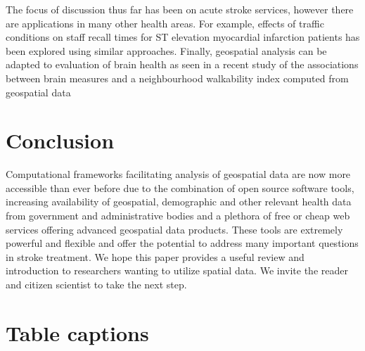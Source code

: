 \documentclass[utf8]{frontiersHLTH}
\begin{document}
The focus of discussion thus far has been on acute stroke services,
however there are applications in many other health areas. For
example, effects of traffic conditions on staff recall times for ST
elevation myocardial infarction patients has been explored using
similar approaches\cite{10.3389/fcvm.2017.00089}. Finally, geospatial
analysis can be adapted to evaluation of brain health as seen in a
recent study of the associations between brain measures and a
neighbourhood walkability index computed from geospatial data
\cite{cerin2017associations}

\section{Conclusion}
Computational frameworks facilitating analysis of geospatial data are
now more accessible than ever before due to the combination of open
source software tools, increasing availability of geospatial,
demographic and other relevant health data from government and
administrative bodies and a plethora of free or cheap web services
offering advanced geospatial data products. These tools are extremely
powerful and flexible and offer the potential to address many
important questions in stroke treatment. We hope this paper provides a
useful review and introduction to researchers wanting to utilize
spatial data. We invite the reader and citizen scientist to take the next step.




\section*{Table captions}
\end{document}
